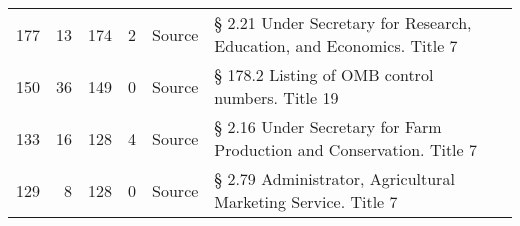 \begin{tabular}{rrrrlp{}p{}}
   177 &      13 &          174 &            2 & Source          & § 2.21 Under Secretary for Research, Education, and Economics. Title 7            &                        \\
   150 &      36 &          149 &            0 & Source          & § 178.2 Listing of OMB control numbers. Title 19                                  &                        \\
   133 &      16 &          128 &            4 & Source          & § 2.16 Under Secretary for Farm Production and Conservation. Title 7              &                        \\
   129 &       8 &          128 &            0 & Source          & § 2.79 Administrator, Agricultural Marketing Service. Title 7                     &                        \\
\hline
\end{tabular}